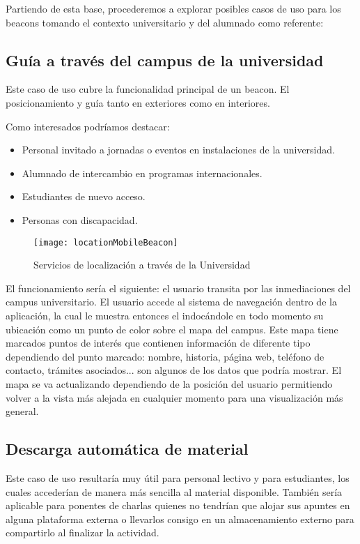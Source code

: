 Partiendo de esta base, procederemos a explorar posibles casos de uso para los beacons tomando el contexto universitario y del alumnado como referente:

\subsection{Guía a través del campus de la universidad}

Este caso de uso cubre la funcionalidad principal de un beacon. El posicionamiento y guía tanto en exteriores como en interiores. 

Como interesados podríamos destacar: 

\begin{itemize}
\item Personal invitado a jornadas o eventos en instalaciones de la universidad.
\item Alumnado de intercambio en programas internacionales.
\item Estudiantes de nuevo acceso.
\item Personas con discapacidad.
\end{itemize}

\begin{figure}[h]
	\centering
	\texttt{[image: locationMobileBeacon]}
	\caption{Servicios de localización a través de la Universidad}
	\label{fig:beaconLocation}
\end{figure}

El funcionamiento sería el siguiente: el usuario transita por las inmediaciones del campus universitario. El usuario accede al sistema de navegación dentro de la aplicación, la cual le muestra entonces el indocándole  en todo momento su ubicación como un punto de color sobre el mapa del campus. Este mapa tiene marcados puntos de interés que contienen información de diferente tipo dependiendo del punto marcado: nombre, historia, página web, teléfono de contacto, trámites asociados... son algunos de los datos que podría mostrar. El mapa se va actualizando dependiendo de la posición del usuario permitiendo volver a la vista más alejada en cualquier momento para una visualización más general.


\subsection{Descarga automática de material} \label{sec:descargaautomatica}

Este caso de uso resultaría muy útil para personal lectivo y para estudiantes, los cuales accederían de manera más sencilla al material disponible. También sería aplicable para ponentes de charlas quienes no tendrían que alojar sus apuntes en alguna plataforma externa o llevarlos consigo en  un almacenamiento externo para compartirlo al finalizar la actividad.

